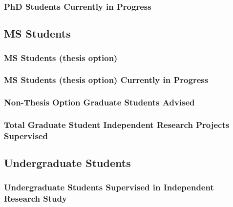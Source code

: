 \subsubsection{PhD Students Currently in Progress}

\subsection{MS Students}
\subsubsection{MS Students (thesis option)}

\subsubsection{MS Students (thesis option) Currently in Progress}

\subsubsection{Non-Thesis Option Graduate Students Advised}
\subsubsection{Total Graduate Student Independent Research Projects Supervised}


\subsection{Undergraduate Students}
\subsubsection{Undergraduate Students Supervised in Independent Research Study}

